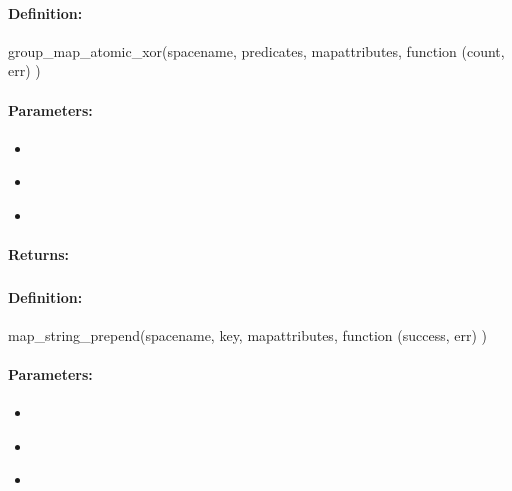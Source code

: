 \paragraph{Definition:}
\begin{javascriptcode}
group_map_atomic_xor(spacename, predicates, mapattributes, function (count, err) {})
\end{javascriptcode}
\paragraph{Parameters:}
\begin{itemize}[noitemsep]
\item {}\\

\item {}\\

\item {}\\

\end{itemize}

\paragraph{Returns:}


\pagebreak
\subsubsection{}
\label{api:nodejs:map_string_prepend}


\paragraph{Definition:}
\begin{javascriptcode}
map_string_prepend(spacename, key, mapattributes, function (success, err) {})
\end{javascriptcode}
\paragraph{Parameters:}
\begin{itemize}[noitemsep]
\item {}\\

\item {}\\

\item {}\\

\end{itemize}

